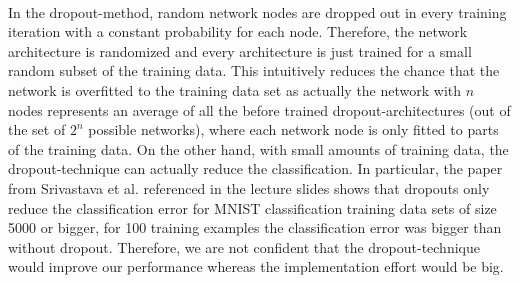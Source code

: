 \documentclass{article}
\begin{document}
\\
In the dropout-method, random network nodes are dropped out in every training iteration with a constant probability for each node. Therefore, the network architecture is randomized and every architecture is just trained for a small random subset of the training data. This intuitively reduces the chance that the network is overfitted to the training data set as actually the network with $n$ nodes represents an average of all the before trained dropout-architectures (out of the set of $2^n$ possible networks), where each network node is only fitted to parts of the training data. On the other hand, with small amounts of training data, the dropout-technique can actually reduce the classification. In particular, the paper from Srivastava et al. referenced in the lecture slides shows that dropouts only reduce the classification error for MNIST classification training data sets of size 5000 or bigger, for 100 training examples the classification error was bigger than without dropout. Therefore, we are not confident that the dropout-technique would improve our performance whereas the implementation effort would be big.
\end{document}

